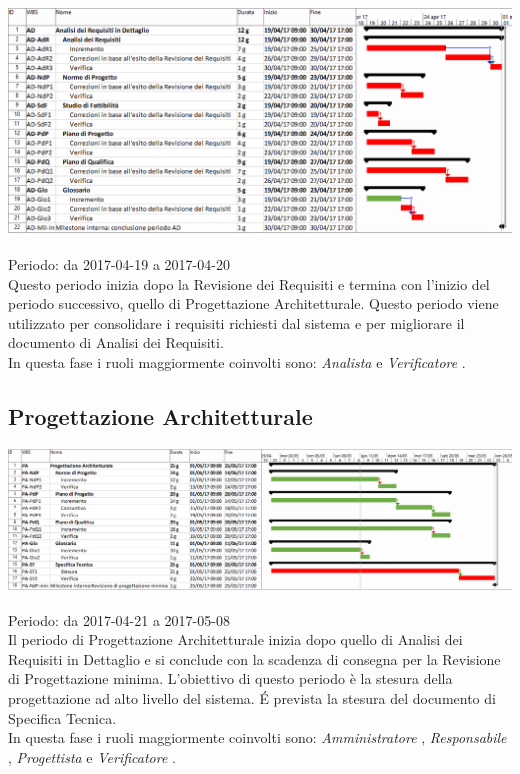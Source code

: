\begin{center}
  \includegraphics[scale=0.3]{img/2-AD.png}
\end{center}

Periodo: da 2017-04-19 a 2017-04-20 \\
Questo periodo inizia dopo la Revisione dei Requisiti e termina con l’inizio del periodo
successivo, quello di Progettazione Architetturale.
Questo periodo viene utilizzato per consolidare i requisiti richiesti dal sistema e per
migliorare il documento di Analisi dei Requisiti.\\
In questa fase i ruoli maggiormente coinvolti sono:  \emph{Analista}  e  \emph{Verificatore} .

\subsection{Progettazione Architetturale}

\begin{center}
  \includegraphics[scale=0.3]{img/3-PA.png}
\end{center}

Periodo: da 2017-04-21 a 2017-05-08 \\
Il periodo di Progettazione Architetturale inizia dopo quello di Analisi dei Requisiti
in Dettaglio e si conclude con la scadenza di consegna per la Revisione di Progettazione minima.
L’obiettivo di questo periodo è la stesura della progettazione ad alto livello del sistema.
\'E prevista la stesura del documento di Specifica Tecnica. \\
In questa fase i ruoli maggiormente coinvolti sono:  \emph{Amministratore} ,  \emph{Responsabile} ,
 \emph{Progettista}  e  \emph{Verificatore} .

